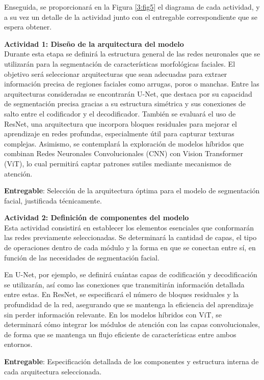  Enseguida, se proporcionará en la Figura \ref{3:fig5} el diagrama de cada actividad, y a su vez un detalle de la actividad junto con el entregable correspondiente que se espera obtener.
 
 \textbf{Actividad 1: Diseño de la arquitectura del modelo}
 \\
 Durante esta etapa se definirá la estructura general de las redes neuronales que se utilizarán para la segmentación de características morfológicas faciales. El objetivo será seleccionar arquitecturas que sean adecuadas para extraer información precisa de regiones faciales como arrugas, poros o manchas.
 Entre las arquitecturas consideradas se encontrarán U-Net, que destaca por su capacidad de segmentación precisa gracias a su estructura simétrica y sus conexiones de salto entre el codificador y el decodificador. También se evaluará el uso de ResNet, una arquitectura que incorpora bloques residuales para mejorar el aprendizaje en redes profundas, especialmente útil para capturar texturas complejas. Asimismo, se contemplará la exploración de modelos híbridos que combinan Redes Neuronales Convolucionales (CNN) con Vision Transformer (ViT), lo cual permitirá captar patrones sutiles mediante mecanismos de atención.
 
 \textbf{Entregable}: Selección de la arquitectura óptima para el modelo de segmentación facial, justificada técnicamente.

 \textbf{Actividad 2: Definición de componentes del modelo}
 \\
Esta actividad consistirá en establecer los elementos esenciales que conformarán las redes previamente seleccionadas. Se determinará la cantidad de capas, el tipo de operaciones dentro de cada módulo y la forma en que se conectan entre sí, en función de las necesidades de segmentación facial.

En U-Net, por ejemplo, se definirá cuántas capas de codificación y decodificación se utilizarán, así como las conexiones que transmitirán información detallada entre estas. En ResNet, se especificará el número de bloques residuales y la profundidad de la red, asegurando que se mantenga la eficiencia del aprendizaje sin perder información relevante. En los modelos híbridos con ViT, se determinará cómo integrar los módulos de atención con las capas convolucionales, de forma que se mantenga un flujo eficiente de características entre ambos entornos.

 \textbf{Entregable}: Especificación detallada de los componentes y estructura interna de cada arquitectura seleccionada.


